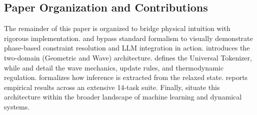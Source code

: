 \documentclass[11pt,a4paper]{article}
\begin{document}
\FloatBarrier

\subsection{Paper Organization and Contributions}

The remainder of this paper is organized to bridge physical intuition with rigorous implementation.  and  bypass standard formalism to visually demonstrate phase-based constraint resolution and LLM integration in action.  introduces the two-domain (Geometric and Wave) architecture.  defines the Universal Tokenizer, while  and  detail the wave mechanics, update rules, and thermodynamic regulation.  formalizes how inference is extracted from the relaxed state.  reports empirical results across an extensive 14-task suite. Finally,  situate this architecture within the broader landscape of machine learning and dynamical systems.
\end{document}
